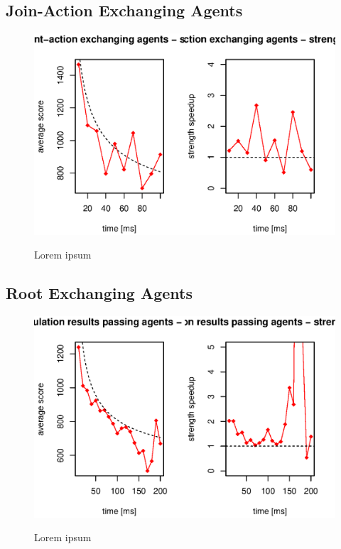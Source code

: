 \subsection{Join-Action Exchanging Agents}

\begin{figure}
\begin{center}
\includegraphics{img/move-exchange-strength.eps}
\end{center}
\caption{\footnotesize Lorem ipsum}{\footnotesize }
\label{fig_action_exchanging_strength}
\end{figure}

\subsection{Root Exchanging Agents}

\begin{figure}
\begin{center}
\includegraphics{img/root-exchange-strength.eps}
\end{center}
\caption{\footnotesize Lorem ipsum}{\footnotesize }
\label{fig_root_exchanging_strength}
\end{figure}

